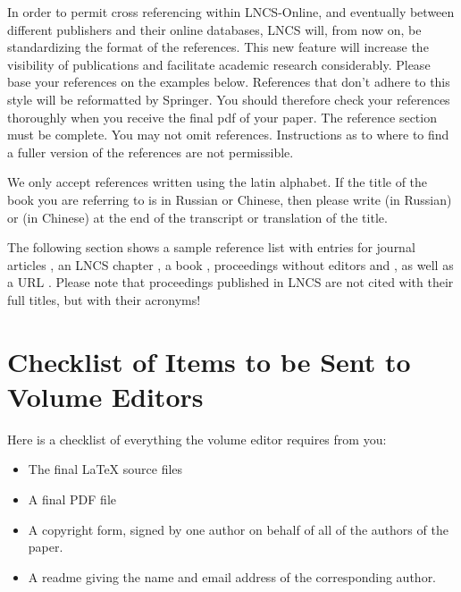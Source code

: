 \documentclass[runningheads,a4paper]{llncs}
\begin{document}
In order to permit cross referencing within LNCS-Online, and eventually
between different publishers and their online databases, LNCS will,
from now on, be standardizing the format of the references. This new
feature will increase the visibility of publications and facilitate
academic research considerably. Please base your references on the
examples below. References that don't adhere to this style will be
reformatted by Springer. You should therefore check your references
thoroughly when you receive the final pdf of your paper.
The reference section must be complete. You may not omit references.
Instructions as to where to find a fuller version of the references are
not permissible.

We only accept references written using the latin alphabet. If the title
of the book you are referring to is in Russian or Chinese, then please write
(in Russian) or (in Chinese) at the end of the transcript or translation
of the title.

The following section shows a sample reference list with entries for
journal articles \cite{jour}, an LNCS chapter \cite{lncschap}, a book
\cite{book}, proceedings without editors \cite{proceeding1} and
\cite{proceeding2}, as well as a URL \cite{url}.
Please note that proceedings published in LNCS are not cited with their
full titles, but with their acronyms!

\section{Checklist of Items to be Sent to Volume Editors}
Here is a checklist of everything the volume editor requires from you:

\begin{itemize}
\settowidth{\leftmargin}{{\Large$\square$}}\advance\leftmargin{}
\itemsep8pt\relax
\renewcommand\labelitemi{{\lower1.5pt\hbox{\Large$\square$}}}

\item The final \LaTeX{} source files
\item A final PDF file
\item A copyright form, signed by one author on behalf of all of the
authors of the paper.
\item A readme giving the name and email address of the
corresponding author.
\end{itemize}
\end{document}
